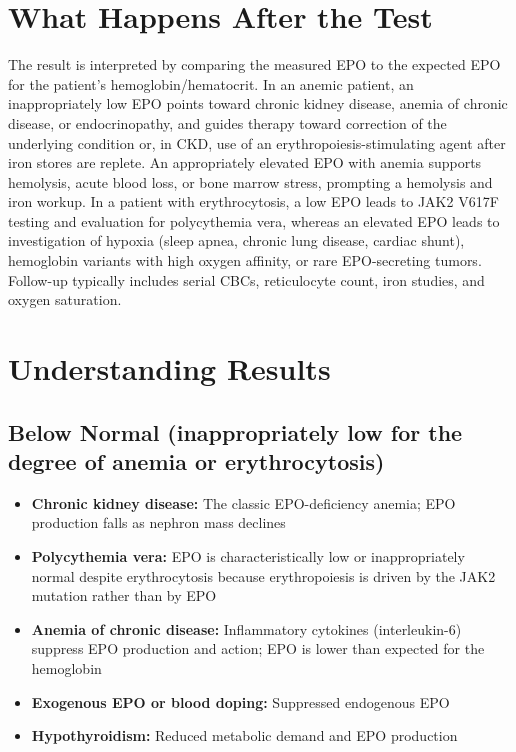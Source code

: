 \section*{What Happens After the Test}
The result is interpreted by comparing the measured EPO to the expected EPO for the patient's hemoglobin/hematocrit. In an anemic patient, an inappropriately low EPO points toward chronic kidney disease, anemia of chronic disease, or endocrinopathy, and guides therapy toward correction of the underlying condition or, in CKD, use of an erythropoiesis-stimulating agent after iron stores are replete. An appropriately elevated EPO with anemia supports hemolysis, acute blood loss, or bone marrow stress, prompting a hemolysis and iron workup. In a patient with erythrocytosis, a low EPO leads to JAK2 V617F testing and evaluation for polycythemia vera, whereas an elevated EPO leads to investigation of hypoxia (sleep apnea, chronic lung disease, cardiac shunt), hemoglobin variants with high oxygen affinity, or rare EPO-secreting tumors. Follow-up typically includes serial CBCs, reticulocyte count, iron studies, and oxygen saturation.

\section*{Understanding Results}

\subsection*{Below Normal (inappropriately low for the degree of anemia or erythrocytosis)}
\begin{itemize}
  \item \textbf{Chronic kidney disease:} The classic EPO-deficiency anemia; EPO production falls as nephron mass declines
  \item \textbf{Polycythemia vera:} EPO is characteristically low or inappropriately normal despite erythrocytosis because erythropoiesis is driven by the JAK2 mutation rather than by EPO
  \item \textbf{Anemia of chronic disease:} Inflammatory cytokines (interleukin-6) suppress EPO production and action; EPO is lower than expected for the hemoglobin
  \item \textbf{Exogenous EPO or blood doping:} Suppressed endogenous EPO
  \item \textbf{Hypothyroidism:} Reduced metabolic demand and EPO production
\end{itemize}

